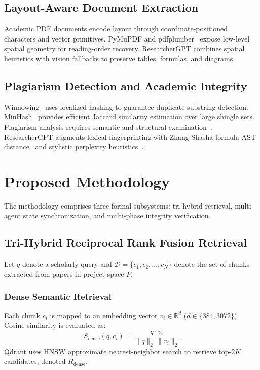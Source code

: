 \documentclass[conference]{IEEEtran}
\begin{document}
\subsection{Layout-Aware Document Extraction}
Academic PDF documents encode layout through coordinate-positioned characters and vector primitives. PyMuPDF and pdfplumber~\cite{singer2023pdfplumber} expose low-level spatial geometry for reading-order recovery. ResearcherGPT combines spatial heuristics with vision fallbacks to preserve tables, formulas, and diagrams.

\subsection{Plagiarism Detection and Academic Integrity}
Winnowing~\cite{schleimer2003winnowing} uses localized hashing to guarantee duplicate substring detection. MinHash~\cite{broder1997minhash} provides efficient Jaccard similarity estimation over large shingle sets. Plagiarism analysis requires semantic and structural examination~\cite{foltynek2019plagiarism}. ResearcherGPT augments lexical fingerprinting with Zhang-Shasha formula AST distance~\cite{zhang1989tree} and stylistic perplexity heuristics~\cite{vaswani2017attention,devlin2019bert}.

\section{Proposed Methodology}
The methodology comprises three formal subsystems: tri-hybrid retrieval, multi-agent state synchronization, and multi-phase integrity verification.

\subsection{Tri-Hybrid Reciprocal Rank Fusion Retrieval}
Let $q$ denote a scholarly query and $\mathcal{D} = \{c_1, c_2, \ldots, c_N\}$ denote the set of chunks extracted from papers in project space $P$.

\subsubsection{Dense Semantic Retrieval}
Each chunk $c_i$ is mapped to an embedding vector $v_i \in \mathbb{R}^d$ ($d \in \{384, 3072\}$). Cosine similarity is evaluated as:
\begin{equation}
S_{\mathrm{dense}}(q, c_i) = \frac{q \cdot v_i}{\|q\|_2 \, \|v_i\|_2}
\label{eq:cosine}
\end{equation}
Qdrant uses HNSW approximate nearest-neighbor search to retrieve top-$2K$ candidates, denoted $R_{\mathrm{dense}}$.
\end{document}
